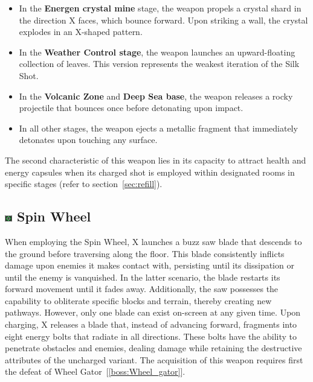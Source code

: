 \begin{itemize}
\item In the \textbf{Energen crystal mine} stage, the weapon propels a crystal shard in the direction X faces, which bounce forward. Upon striking a wall, the crystal explodes in an X-shaped pattern.
\item In the \textbf{Weather Control stage}, the weapon launches an upward-floating collection of leaves. This version represents the weakest iteration of the Silk Shot.
\item In the \textbf{Volcanic Zone} and \textbf{Deep Sea base}, the weapon releases a rocky projectile that bounces once before detonating upon impact.
\item In all other stages, the weapon ejects a metallic fragment that immediately detonates upon touching any surface.
\end{itemize}

The second characteristic of this weapon lies in its capacity to attract health and energy capsules when its charged shot is employed within designated rooms in specific stages (refer to section~\ref{sec:refill}).


\subsection{\includegraphics[width=12px, height=10px]{figures/X2/weapons/S_wheel.png} Spin Wheel}\label{Spinning_wheel}
When employing the Spin Wheel, X launches a buzz saw blade that descends to the ground before traversing along the floor. This blade consistently inflicts damage upon enemies it makes contact with, persisting until its dissipation or until the enemy is vanquished. In the latter scenario, the blade restarts its forward movement until it fades away. Additionally, the saw possesses the capability to obliterate specific blocks and terrain, thereby creating new pathways. However, only one blade can exist on-screen at any given time. Upon charging, X releases a blade that, instead of advancing forward, fragments into eight energy bolts that radiate in all directions. These bolts have the ability to penetrate obstacles and enemies, dealing damage while retaining the destructive attributes of the uncharged variant. The acquisition of this weapon requires first the defeat of Wheel Gator~[\ref{boss:Wheel_gator}].

